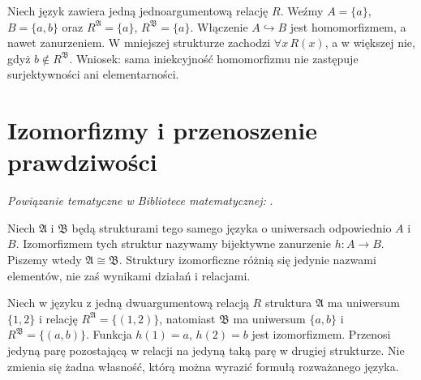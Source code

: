 \begin{przyklad}
Niech język zawiera jedną jednoargumentową relację $R$.
Weźmy $A=\{a\}$, $B=\{a,b\}$ oraz
$R^{\mathfrak A}=\{a\}$, $R^{\mathfrak B}=\{a\}$.
Włączenie $A\hookrightarrow B$ jest homomorfizmem,
a nawet zanurzeniem. W mniejszej strukturze zachodzi
$\forall x\,R(x)$, a w większej nie, gdyż $b\notin R^{\mathfrak B}$.
Wniosek: sama iniekcyjność homomorfizmu nie zastępuje
surjektywności ani elementarności.
\end{przyklad}

\section{Izomorfizmy i przenoszenie prawdziwości}

\noindent\emph{Powiązanie tematyczne w Bibliotece matematycznej:} .

\begin{definicja}[Izomorfizm]\label{def:model-isomorphism}
Niech $\mathfrak A$ i $\mathfrak B$ będą strukturami tego samego
języka o uniwersach odpowiednio $A$ i $B$.
Izomorfizmem tych struktur nazywamy bijektywne zanurzenie $h:A\to B$. Piszemy wtedy
$\mathfrak A\cong\mathfrak B$. Struktury izomorficzne różnią się
jedynie nazwami elementów, nie zaś wynikami działań i relacjami.
\end{definicja}

\begin{przyklad}
Niech w języku z jedną dwuargumentową relacją $R$
struktura $\mathfrak A$ ma uniwersum $\{1,2\}$
i relację $R^{\mathfrak A}=\{(1,2)\}$, natomiast
$\mathfrak B$ ma uniwersum $\{a,b\}$ i
$R^{\mathfrak B}=\{(a,b)\}$. Funkcja $h(1)=a$,
$h(2)=b$ jest izomorfizmem. Przenosi jedyną parę
pozostającą w relacji na jedyną taką parę w drugiej strukturze.
Nie zmienia się żadna własność, którą można wyrazić formułą
rozważanego języka.
\end{przyklad}

